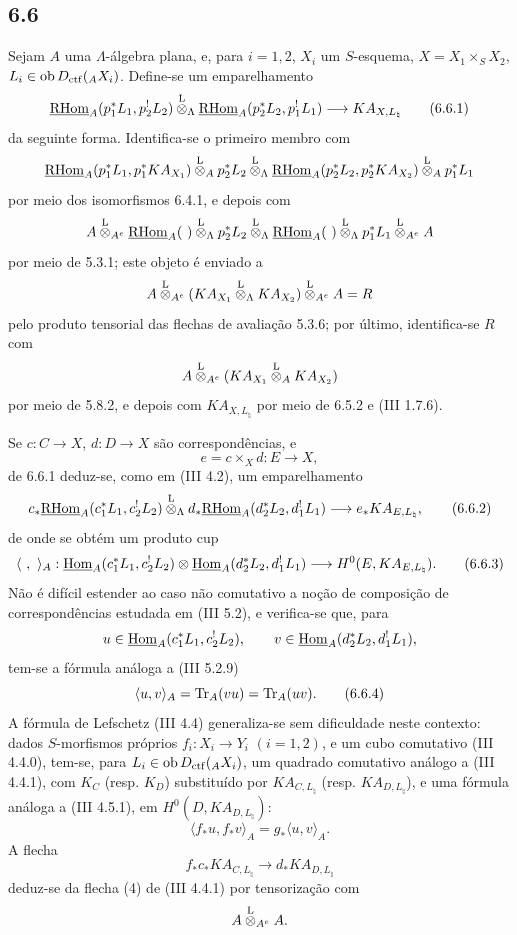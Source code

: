 \subsection*{6.6}
Sejam $A$ uma $\Lambda$-álgebra plana, e, para $i=1,2$, $X_i$ um $S$-esquema, $X=X_1\times_SX_2$, $L_i\in\operatorname{ob} D_{\mathrm{ctf}}({}_AX_i)$. Define-se um emparelhamento
\begin{equation}
\underline{\mathrm{RHom}}_A(p_1^*L_1,p_2^!L_2)
\overset{\mathrm L}{\otimes}_{\Lambda}
\underline{\mathrm{RHom}}_A(p_2^*L_2,p_1^!L_1)
\longrightarrow
KA_{X,L_{\natural}}
\tag{6.6.1}
\end{equation}
da seguinte forma. Identifica-se o primeiro membro com
\[
\underline{\mathrm{RHom}}_A(p_1^*L_1,p_1^*KA_{X_1})
\overset{\mathrm L}{\otimes}_A p_2^*L_2
\overset{\mathrm L}{\otimes}_{\Lambda}
\underline{\mathrm{RHom}}_A(p_2^*L_2,p_2^*KA_{X_2})
\overset{\mathrm L}{\otimes}_A p_1^*L_1
\]
por meio dos isomorfismos 6.4.1, e depois com
\[
A\lten_{A^e}\uRHom_A(\ )\lten_{\Lambda}p_2^*L_2
 \lten_{\Lambda}\uRHom_A(\ )\lten_{\Lambda}p_1^*L_1\lten_{A^e}A
\]
por meio de 5.3.1; este objeto é enviado a
\[
A\overset{\mathrm L}{\otimes}_{A^e}(KA_{X_1}\overset{\mathrm L}{\otimes}_{\Lambda}KA_{X_2})\overset{\mathrm L}{\otimes}_{A^e}A=R
\]
pelo produto tensorial das flechas de avaliação 5.3.6; por último, identifica-se $R$ com
\[
A\overset{\mathrm L}{\otimes}_{A^e}(KA_{X_1}\overset{\mathrm L}{\otimes}_A KA_{X_2})
\]
por meio de 5.8.2, e depois com $KA_{X,L_{\natural}}$ por meio de 6.5.2 e (III 1.7.6).

Se $c:C\to X$, $d:D\to X$ são correspondências, e
\[
e=c\times_Xd:E\to X,
\]
de 6.6.1 deduz-se, como em (III 4.2), um emparelhamento
\begin{equation}
c_*\underline{\mathrm{RHom}}_A(c_1^*L_1,c_2^!L_2)
\overset{\mathrm L}{\otimes}_{\Lambda}
d_*\underline{\mathrm{RHom}}_A(d_2^*L_2,d_1^!L_1)
\longrightarrow
e_*KA_{E,L_{\natural}},
\tag{6.6.2}
\end{equation}
de onde se obtém um produto cup
\begin{equation}
\langle\ ,\ \rangle_A:
\underline{\operatorname{Hom}}_A(c_1^*L_1,c_2^!L_2)\otimes
\underline{\operatorname{Hom}}_A(d_2^*L_2,d_1^!L_1)
\longrightarrow
H^0(E,KA_{E,L_{\natural}}).
\tag{6.6.3}
\end{equation}
Não é difícil estender ao caso não comutativo a noção de composição de correspondências estudada em (III 5.2), e verifica-se que, para
\[
u\in\underline{\operatorname{Hom}}_A(c_1^*L_1,c_2^!L_2),\qquad
v\in\underline{\operatorname{Hom}}_A(d_2^*L_2,d_1^!L_1),
\]
tem-se a fórmula análoga a (III 5.2.9)
\begin{equation}
\langle u,v\rangle_A=\operatorname{Tr}_A(vu)=\operatorname{Tr}_A(uv).
\tag{6.6.4}
\end{equation}
A fórmula de Lefschetz (III 4.4) generaliza-se sem dificuldade neste contexto: dados $S$-morfismos próprios $f_i:X_i\to Y_i$ $(i=1,2)$, e um cubo comutativo (III 4.4.0), tem-se, para $L_i\in\operatorname{ob} D_{\mathrm{ctf}}({}_AX_i)$, um quadrado comutativo análogo a (III 4.4.1), com $K_C$ (resp. $K_D$) substituído por $KA_{C,L_{\natural}}$ (resp. $KA_{D,L_{\natural}}$), e uma fórmula análoga a (III 4.5.1), em $H^0(D,KA_{D,L_{\natural}})$:
\begin{equation}
\langle f_*u,f_*v\rangle_A=g_*\langle u,v\rangle_A.
\tag{6.6.5}
\end{equation}
A flecha
\[
f_*c_*KA_{C,L_{\natural}}\longrightarrow d_*KA_{D,L_{\natural}}
\]
deduz-se da flecha (4) de (III 4.4.1) por tensorização com
\[
A\overset{\mathrm L}{\otimes}_{A^e}A .
\]
